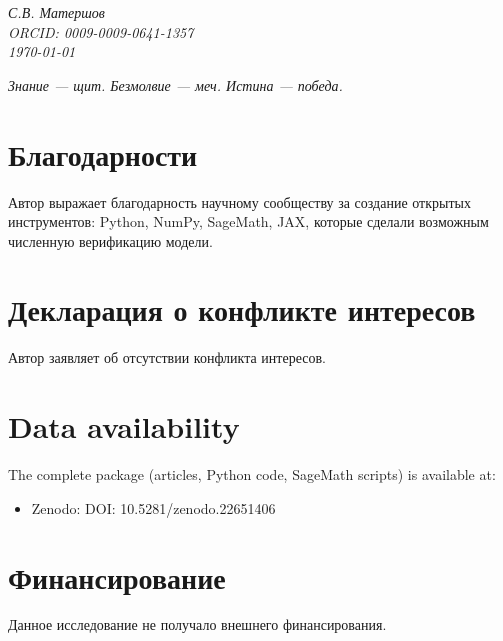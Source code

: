 \documentclass[12pt,a4paper,twoside]{article}
\theoremstyle{definition}
\begin{document}
\vspace{0.5cm}
\begin{flushright}
\textit{С.В. Матершов}\\
\textit{ORCID: 0009-0009-0641-1357}\\
\textit{\today}
\end{flushright}

\vspace{0.3cm}
\begin{center}
\begin{tcolorbox}[
  enhanced,
  colback=lightgray,
  colframe=gold,
  boxrule=0.6pt,
  arc=3pt,
  width=0.7\textwidth,
  center
]
\centering\itshape\color{deepgray}
Знание — щит. Безмолвие — меч. Истина — победа.
\end{tcolorbox}
\end{center}

\section*{Благодарности}
Автор выражает благодарность научному сообществу за создание открытых инструментов: Python, NumPy, SageMath, JAX, которые сделали возможным численную верификацию модели.

\section*{Декларация о конфликте интересов}
Автор заявляет об отсутствии конфликта интересов.

\section*{Data availability}
The complete package (articles, Python code, SageMath scripts) is available at:
\begin{itemize}
    \item Zenodo: DOI: 10.5281/zenodo.22651406
\end{itemize}
                                                    
\section*{Финансирование}
Данное исследование не получало внешнего финансирования.
\end{document}
